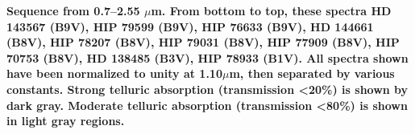 {\bf Sequence from 0.7–2.55 $\mu$m. From bottom to top, these spectra HD 143567 (B9V), HIP 79599 (B9V), HIP 76633 (B9V), HD 144661 (B8V), HIP 78207 (B8V), HIP 79031 (B8V), HIP 77909 (B8V), HIP 70753 (B8V), HD 138485 (B3V), HIP 78933 (B1V).
All spectra shown have been normalized to unity at 1.10$\mu$m, then separated by various constants.  Strong telluric absorption (transmission <20\%) is shown by dark gray.  Moderate telluric absorption (transmission <80\%) is shown in light gray regions.\label{fig:stack-plot-b}}

